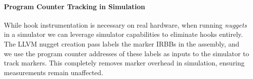 \paragraph*{Program Counter Tracking in Simulation}

While hook instrumentation is necessary on real hardware, when running \emph{nuggets} in a simulator we can leverage simulator capabilities to eliminate hooks entirely.
The LLVM nugget creation pass labels the marker IRBBs in the assembly, and we use the program counter addresses of these labels as inputs to the simulator to track markers.
This completely removes marker overhead in simulation, ensuring measurements remain unaffected.
